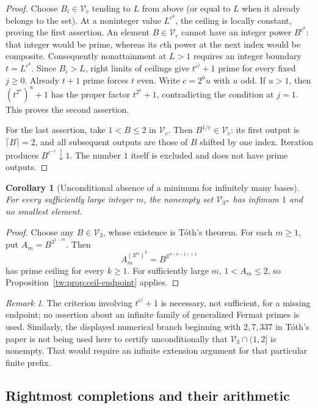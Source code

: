 \documentclass[11pt,a4paper]{article}
\newtheorem{corollary}[theorem]{Corollary}
\theoremstyle{definition}
\theoremstyle{remark}
\newtheorem{remark}[theorem]{Remark}
\numberwithin{equation}{section}
\begin{document}
\begin{proof}
Choose $B_i\in\mathcal V_c$ tending to $L$ from above (or equal to $L$
when it already belongs to the set). At a noninteger value $L^{c^k}$,
the ceiling is locally constant, proving the first assertion.
An element $B\in\mathcal V_c$ cannot have an integer power $B^{c^k}$:
that integer would be prime, whereas its $c$th power at the next index
would be composite. Consequently nonattainment at $L>1$ requires an
integer boundary $t=L^{c^k}$. Since $B_i>L$, right limits of ceilings
give $t^{c^j}+1$ prime for every fixed $j\geq0$. Already $t+1$ prime
forces $t$ even. Write $c=2^a u$ with $u$ odd. If $u>1$, then
$(t^{2^a})^u+1$ has the proper factor $t^{2^a}+1$, contradicting the
condition at $j=1$. This proves the second assertion.

For the last assertion, take $1<B\leq2$ in $\mathcal V_c$.
Then $B^{1/c}\in\mathcal V_c$: its first output is $\lceil B\rceil=2$,
and all subsequent outputs are those of $B$ shifted by one index.
Iteration produces $B^{c^{-r}}\downarrow1$. The number $1$ itself is
excluded and does not have prime outputs.
\end{proof}

\begin{corollary}[Unconditional absence of a minimum for infinitely many bases]
For every sufficiently large integer $m$, the nonempty set
$\mathcal V_{3^m}$ has infimum $1$ and no smallest element.
\end{corollary}

\begin{proof}
Choose any $B\in\mathcal V_3$, whose existence is T\'oth's theorem.
For each $m\geq1$, put $A_m=B^{3^{1-m}}$. Then
\[
 A_m^{(3^m)^k}=B^{3^{m(k-1)+1}}
\]
has prime ceiling for every $k\geq1$. For sufficiently large $m$,
$1<A_m\leq2$, so Proposition~\ref{tw:prop:ceil-endpoint} applies.
\end{proof}

\begin{remark}
The criterion involving $t^{c^j}+1$ is necessary, not sufficient, for a
missing endpoint; no assertion about an infinite family of generalized
Fermat primes is used. Similarly, the displayed numerical branch beginning
with $2,7,337$ in T\'oth's paper is not being used here to certify
unconditionally that $\mathcal V_3\cap(1,2]$ is nonempty. That would
require an infinite extension argument for that particular finite prefix.
\end{remark}

\subsection{Rightmost completions and their arithmetic}
\end{document}
